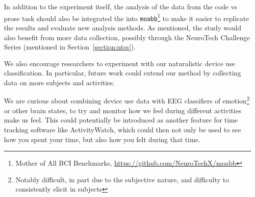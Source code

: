 In addition to the experiment itself, the analysis of the data from the code vs prose task should also be integrated the into \texttt{moabb}\footnote{Mother of All BCI Benchmarks, \url{https://github.com/NeuroTechX/moabb}} to make it easier to replicate the results and evaluate new analysis methods. As mentioned, the study would also benefit from more data collection, possibly through the NeuroTech Challenge Series (mentioned in Section~\ref{section:ntcs}).

We also encourage researchers to experiment with our naturalistic device use classification. In particular, future work could extend our method by collecting data on more subjects and activities.

We are curious about combining device use data with EEG classifiers of emotion\footnote{Notably difficult, in part due to the subjective nature, and difficulty to consistently elicit in subjects} or other brain states, to try and monitor how we feel during different activities make us feel. This could potentially be introduced as another feature for time tracking software like ActivityWatch, which could then not only be used to see how you spent your time, but also how you felt during that time.

